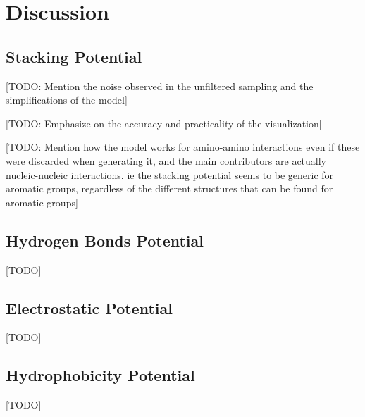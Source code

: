 \chapter{Discussion} %

\section{Stacking Potential}
  [TODO: Mention the noise observed in the unfiltered sampling and the simplifications of the model]

  [TODO: Emphasize on the accuracy and practicality of the visualization]

  [TODO: Mention how the model works for amino-amino interactions even if these were discarded when generating it, and the main contributors are actually nucleic-nucleic interactions. ie the stacking potential seems to be generic for aromatic groups, regardless of the different structures that can be found for aromatic groups]


\section{Hydrogen Bonds Potential}
  [TODO]


\section{Electrostatic Potential}
  [TODO]


\section{Hydrophobicity Potential}
  [TODO]


